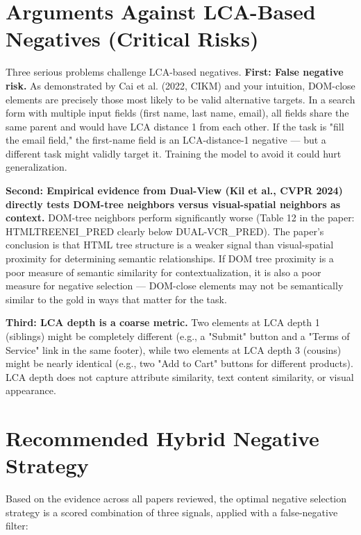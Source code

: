 \documentclass[pdflatex,sn-mathphys-num]{sn-jnl}
\theoremstyle{thmstyleone}
\theoremstyle{thmstyletwo}
\theoremstyle{thmstylethree}
\begin{document}
\section{Arguments Against LCA-Based Negatives (Critical Risks)}
Three serious problems challenge LCA-based negatives. \textbf{First: False negative risk.} As demonstrated by Cai et al. (2022, CIKM) and your intuition, DOM-close elements are precisely those most likely to be valid alternative targets. In a search form with multiple input fields (first name, last name, email), all fields share the same parent and would have LCA distance 1 from each other. If the task is "fill the email field," the first-name field is an LCA-distance-1 negative --- but a different task might validly target it. Training the model to avoid it could hurt generalization.

\textbf{Second: Empirical evidence from Dual-View (Kil et al., CVPR 2024) directly tests DOM-tree neighbors versus visual-spatial neighbors as context.} DOM-tree neighbors perform significantly worse (Table 12 in the paper: HTMLTREENEI\_PRED clearly below DUAL-VCR\_PRED). The paper's conclusion is that HTML tree structure is a weaker signal than visual-spatial proximity for determining semantic relationships. If DOM tree proximity is a poor measure of semantic similarity for contextualization, it is also a poor measure for negative selection --- DOM-close elements may not be semantically similar to the gold in ways that matter for the task.

\textbf{Third: LCA depth is a coarse metric.} Two elements at LCA depth 1 (siblings) might be completely different (e.g., a "Submit" button and a "Terms of Service" link in the same footer), while two elements at LCA depth 3 (cousins) might be nearly identical (e.g., two "Add to Cart" buttons for different products). LCA depth does not capture attribute similarity, text content similarity, or visual appearance.

\section{Recommended Hybrid Negative Strategy}
Based on the evidence across all papers reviewed, the optimal negative selection strategy is a scored combination of three signals, applied with a false-negative filter:
\end{document}
